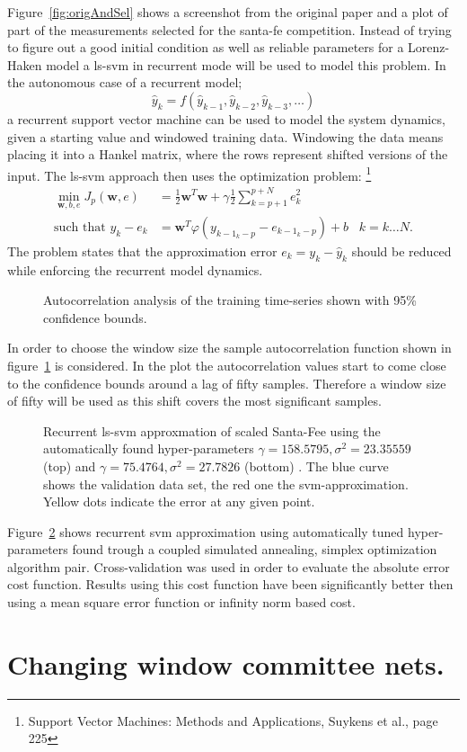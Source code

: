 Figure~\ref{fig:origAndSel} shows a screenshot from the original paper and a plot of part of the measurements selected for the santa-fe competition. Instead of trying to figure out a good initial condition as well as reliable parameters for a Lorenz-Haken model a ls-svm in recurrent mode will be used to model this problem.
In the autonomous case of a recurrent model;
\begin{equation}
\hat{y}_k = f(\hat{y}_{k-1}, \hat{y}_{k-2}, \hat{y}_{k-3}, \dots)
\end{equation} 
a recurrent support vector machine can be used to model the system dynamics, given a starting value and windowed training data. Windowing the data means placing it into a Hankel matrix, where the rows represent shifted versions of the input. The ls-svm approach then uses the optimization problem: \footnote{Support Vector Machines: Methods and Applications, Suykens et al., page 225}
\begin{align}
\min\limits_{\mathbf{w},b,e} J_p(\mathbf{w},e) &= \frac{1}{2}\mathbf{w}^T \mathbf{w} + \gamma \frac{1}{2}\sum\limits_{k = p+1}^{p+N} e_k^2 \\
\text{such that } y_k - e_k &= \mathbf{w}^T \varphi(y_{k-1_k-p} - e_{k-1_k-p}) + b \;\;\; k = k \dots N.
\end{align}
The problem states that the approximation error $e_k  = y_k - \hat{y}_k$ should be reduced while enforcing the recurrent model dynamics. \\
\begin{figure}
\centering

\caption{Autocorrelation analysis of the training time-series shown with 95\% confidence bounds.}
\label{fig:santaFeAutocorr}
\end{figure}
In order to choose the window size the sample autocorrelation function shown in figure~\ref{fig:santaFeAutocorr} is considered. In the plot the autocorrelation values start to come close to the confidence bounds around a lag of fifty samples. Therefore a window size of fifty will be used as this shift covers the most significant samples. \\
\begin{figure}
\centering
\tikzset{mark size=1}


\caption{Recurrent ls-svm approxmation of scaled Santa-Fee using the automatically found hyper-parameters $\gamma =  158.5795, \sigma^2 = 23.35559$ (top) and $\gamma = 75.4764, \sigma^2 = 27.7826$ (bottom) . The blue curve shows the validation data set, the red one the svm-approximation. Yellow dots indicate the error at any given point.}
\label{fig:santaFe}
\end{figure}
 Figure~\ref{fig:santaFe} shows recurrent svm approximation using automatically tuned hyper-parameters found trough a coupled simulated annealing, simplex optimization algorithm pair. Cross-validation was used in order to evaluate the  absolute error cost function. Results using this cost function have been significantly better then using a mean square error function or infinity norm based cost.   
      


\section{Changing window committee nets.}